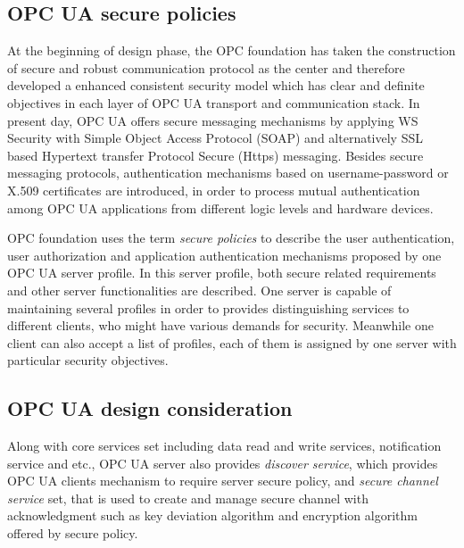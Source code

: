\subsection{OPC UA secure policies}
At the beginning of design phase, the OPC foundation has taken the construction of secure and robust communication protocol as the center and therefore developed a enhanced consistent security model which has clear and definite objectives in each layer of OPC UA transport and communication stack. In present day, OPC UA  offers secure messaging mechanisms by applying WS Security with Simple Object Access Protocol (SOAP)  and alternatively SSL based Hypertext transfer Protocol Secure (Https) messaging\cite{opc_secure_1}. Besides secure messaging protocols,  authentication mechanisms based on username-password or X.509 certificates are introduced, in order to process mutual authentication among OPC UA applications from different logic levels and hardware devices.

OPC foundation uses the term \emph{secure policies}\cite{O2} to describe the 
user authentication, user authorization and application authentication mechanisms proposed by one OPC UA server profile. In this server profile, both secure related requirements and other server functionalities are described. One server is capable of maintaining several profiles in order to provides distinguishing services to different clients, who might have various demands for security. Meanwhile one client can also accept a list of profiles, each of them is assigned by one server with particular security objectives. 

\subsection{OPC UA design consideration}
Along with core services set including data read and write services, notification service and etc., OPC UA server also provides \emph{discover service}\cite{O4}, which provides OPC UA clients mechanism to require server secure policy, and \emph{secure channel service} set\cite{O4}, that is used to create and manage secure channel with acknowledgment such as key deviation algorithm and encryption algorithm offered by secure policy. 

